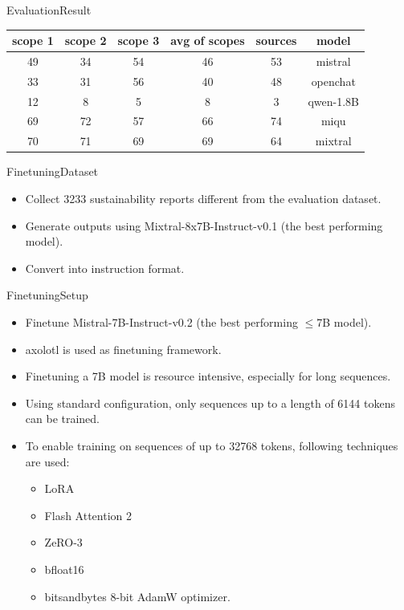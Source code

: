 \documentclass{beamer}
\begin{document}
\begin{frame}{Evaluation}{Result}
\begin{table}[h]
	\centering
	\begin{tabular}{|c|c|c|c|c|c|}
		\hline
		\textbf{scope 1} & \textbf{scope 2} & \textbf{scope 3} & \textbf{avg of scopes} & \textbf{sources} & \textbf{model} \\
		\hline
		49 & 34 & 54 & 46 & 53 & mistral \\
		33 & 31 & 56 & 40 & 48 & openchat \\
		12 & 8 & 5 & 8 & 3 & qwen-1.8B \\
		69 & 72 & 57 & 66 & 74 & miqu \\
		70 & 71 & 69 & 69 & 64 & mixtral \\
		\hline
	\end{tabular}
\end{table}
\end{frame}
\begin{frame}{Finetuning}{Dataset}
\begin{itemize}
\item Collect 3233 sustainability reports different from the evaluation dataset.
\item Generate outputs using Mixtral-8x7B-Instruct-v0.1 (the best performing model).
\item Convert into instruction format.
\end{itemize}
\end{frame}

\begin{frame}{Finetuning}{Setup}
\begin{itemize}
\item Finetune Mistral-7B-Instruct-v0.2 (the best performing $\leq$7B model).
\item axolotl is used as finetuning framework.
\item Finetuning a 7B model is resource intensive, especially for long sequences.
\item Using standard configuration, only sequences up to a length of 6144 tokens can be trained.
\item To enable training on sequences of up to 32768 tokens, following techniques are used:
\begin{itemize}
\item LoRA
\item Flash Attention 2
\item ZeRO-3
\item bfloat16
\item bitsandbytes 8-bit AdamW optimizer.
\end{itemize}
\end{itemize}
\end{frame}
\end{document}
